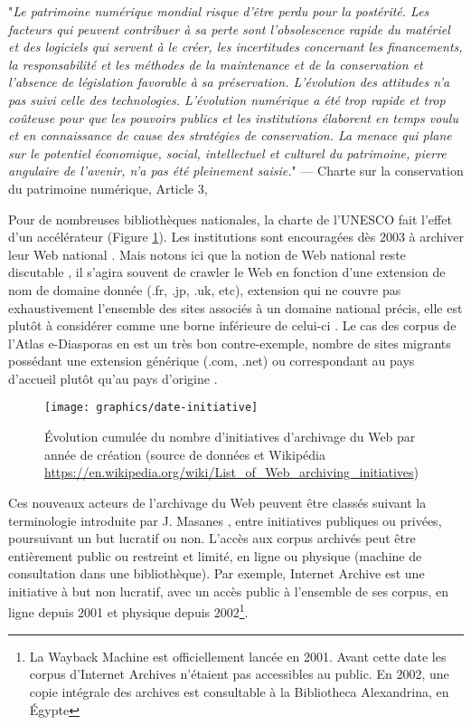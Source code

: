 \documentclass[symmetric,justified,marginals=raggedouter]{tufte-book}
\begin{document}
\begin{fullwidth}
"\textit{Le  patrimoine  numérique  mondial  risque  d'être  perdu  pour  la  postérité.  Les  facteurs  qui  peuvent  contribuer  à  sa  perte  sont  l'obsolescence  rapide  du  matériel  et  des  logiciels  qui  servent  à  le  créer,  les  incertitudes  concernant  les  financements,  la  responsabilité  et  les  méthodes  de  la  maintenance  et  de  la  conservation et l'absence de législation favorable à sa préservation. L'évolution des attitudes n'a pas suivi celle des technologies. L'évolution numérique a été trop rapide et trop coûteuse pour que les pouvoirs publics et les institutions élaborent en temps voulu et en connaissance de cause des stratégies de conservation. La menace qui plane sur le potentiel économique, social, intellectuel et culturel du patrimoine, pierre angulaire de l'avenir, n'a pas été pleinement saisie.}" --- Charte sur la conservation du patrimoine numérique, Article 3, \citep{unesco_charter_2003}\\
\end{fullwidth}

\noindent Pour de nombreuses bibliothèques nationales, la charte de l'UNESCO fait l'effet d'un accélérateur (Figure \ref{fig:date-initiative}). Les institutions sont encouragées dès 2003 à archiver leur Web national \citep{gomes_survey_2011}. Mais notons ici que la notion de Web national reste discutable \citep{abiteboul_first_2002}, il s'agira souvent de crawler le Web en fonction d'une extension de nom de domaine donnée (.fr, .jp, .uk, etc), extension qui ne couvre pas exhaustivement l'ensemble des sites associés à un domaine national précis, elle est plutôt à considérer comme une borne inférieure de celui-ci \citep{koehler_analysis_1999}. Le cas des corpus de l'Atlas e-Diasporas en est un très bon contre-exemple, nombre de sites migrants possédant une extension générique (.com, .net) ou correspondant au pays d'accueil plutôt qu'au pays d'origine \citep{leclerc_cyberespace_2012}.  

\begin{figure}%
  \texttt{[image: graphics/date-initiative]}
  \caption{Évolution cumulée du nombre d'initiatives d'archivage du Web par année de création (source de données \citep{gomes_survey_2011} et Wikipédia \url{https://en.wikipedia.org/wiki/List_of_Web_archiving_initiatives})}
  \label{fig:date-initiative}
\end{figure} 

\noindent Ces nouveaux acteurs de l'archivage du Web peuvent être classés suivant la terminologie introduite par J. Masanes \citep[p.76]{masanes_web_2006}, entre initiatives publiques ou privées, poursuivant un but lucratif ou non. L'accès aux corpus archivés peut être entièrement public ou restreint et limité, en ligne ou physique (machine de consultation dans une bibliothèque). Par exemple, Internet Archive est une initiative à but non lucratif, avec un accès public à l'ensemble de ses corpus, en ligne depuis 2001 et physique depuis 2002\footnote{La Wayback Machine est officiellement lancée en 2001. Avant cette date les corpus d'Internet Archives n'étaient pas accessibles au public. En 2002, une copie intégrale des archives est consultable à la Bibliotheca Alexandrina, en Égypte}. 
\end{document}
